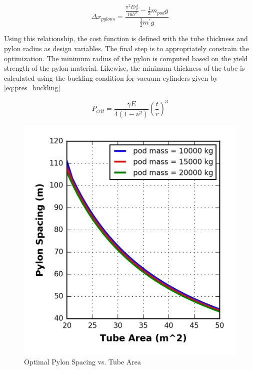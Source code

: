 \begin{equation}
	\label{eq:pylon_spacing}
	\Delta x_{pylons} = \frac{\frac{\pi ^{2}Er_{p}^{4}}{16h^{2}} - \frac{1}{2}m_{pod}g}{\frac{1}{2}m^{'}g}
\end{equation}

Using this relationship, the cost function is defined with the tube thickness
and pylon radius as design variables. The final step is to appropriately constrain the optimization.
The minimum radius of the pylon is computed based on the yield strength of the pylon material.
Likewise, the minimum thickness of the tube is calculated using the buckling
condition for vacuum cylinders given by \cref{eq:pres_buckling} \cite{Buckling}

\begin{equation}
	\label{eq:pres_buckling}
	P_{crit} = \frac{\gamma E}{4 ( 1-\nu^{2}  )} ( \frac{t}{r} )^{3}
\end{equation}

\begin{figure}
	\centering
	\includegraphics{../../images/graphs/overland_structural_trades/pylon_spacing_vs_tube_area.png}
	\caption{Optimal Pylon Spacing vs. Tube Area}
	\label{fig:pylon_spacing_vs_tube_area}
\end{figure}

